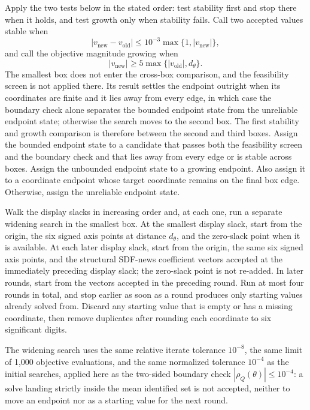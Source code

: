 \documentclass[11pt]{article}
\begin{document}
Apply the two tests below in the stated
order: test stability first and stop there when it holds, and test growth only when stability fails.
Call two accepted values stable when
\begin{equation*}
 |v_{\mathrm{new}}-v_{\mathrm{old}}|
 \le10^{-3}\max\{1,|v_{\mathrm{new}}|\},
\end{equation*}
and call the objective magnitude growing when
\begin{equation*}
 |v_{\mathrm{new}}|\ge5\max\{|v_{\mathrm{old}}|,d_\theta\}.
\end{equation*}
The smallest box does not enter the cross-box comparison, and the feasibility screen is not applied
there. Its result settles the endpoint outright when its coordinates are finite and it lies away
from every edge, in which case the boundary check alone separates the bounded endpoint state from the
unreliable endpoint state; otherwise the search moves to the second box. The first stability and growth
comparison is therefore between the second and third boxes. Assign the bounded endpoint state to a
candidate that passes both the feasibility screen and the boundary check and that lies away from
every edge or is stable across boxes. Assign the unbounded endpoint state to a growing endpoint. Also assign it to a
coordinate endpoint whose target coordinate remains on the final box edge. Otherwise, assign the
unreliable endpoint state.

Walk the display slacks in increasing order and, at each one, run a separate widening search in the
smallest box. At the smallest display slack, start from the origin, the six signed axis points at
distance \(d_\theta\), and the zero-slack point when it is available. At each later display slack,
start from the origin, the same six signed axis points, and the structural SDF-news coefficient
vectors accepted at the immediately preceding display slack; the zero-slack point is not re-added. In
later rounds, start from the vectors accepted in the preceding round. Run at most four rounds in
total, and stop earlier as soon as a round produces only starting values already solved from. Discard any starting value that is empty or has a missing coordinate, then remove
duplicates after rounding each coordinate to six significant
digits.

The widening search uses the same relative iterate tolerance \(10^{-8}\), the same limit of
1,000 objective evaluations, and the same normalized tolerance \(10^{-4}\) as the initial
searches, applied here as the two-sided boundary check \(|\rho_Q(\theta)|\le10^{-4}\): a solve landing
strictly inside the mean identified set is not accepted, neither to move an endpoint nor as a
starting value for the next round.
\end{document}
